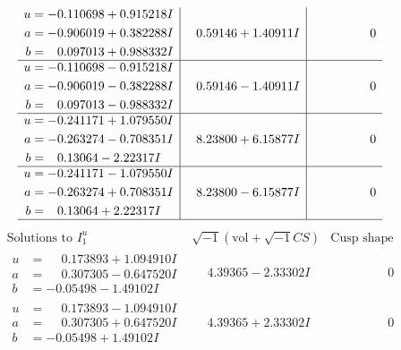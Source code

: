 \documentclass[1p]{elsarticle_modified}
\theoremstyle{definition}
\newcommand{\I}{\sqrt{-1}}
\begin{document}
$$\begin{array}{c|c|c}
\begin{aligned}
u &= -0.110698 + 0.915218 I \\
a &= -0.906019 + 0.382288 I \\
b &= \phantom{-}0.097013 + 0.988332 I\end{aligned}
 & \phantom{-}0.59146 + 1.40911 I & \phantom{-0.000000 } 0 \\ \hline\begin{aligned}
u &= -0.110698 - 0.915218 I \\
a &= -0.906019 - 0.382288 I \\
b &= \phantom{-}0.097013 - 0.988332 I\end{aligned}
 & \phantom{-}0.59146 - 1.40911 I & \phantom{-0.000000 } 0 \\ \hline\begin{aligned}
u &= -0.241171 + 1.079550 I \\
a &= -0.263274 - 0.708351 I \\
b &= \phantom{-}0.13064 - 2.22317 I\end{aligned}
 & \phantom{-}8.23800 + 6.15877 I & \phantom{-0.000000 } 0 \\ \hline\begin{aligned}
u &= -0.241171 - 1.079550 I \\
a &= -0.263274 + 0.708351 I \\
b &= \phantom{-}0.13064 + 2.22317 I\end{aligned}
 & \phantom{-}8.23800 - 6.15877 I & \phantom{-0.000000 } 0\\
 \hline 
 \end{array}$$\newpage$$\begin{array}{c|c|c}  
\text{Solutions to }I^u_{1}& \I (\text{vol} + \sqrt{-1}CS) & \text{Cusp shape}\\
 \hline 
\begin{aligned}
u &= \phantom{-}0.173893 + 1.094910 I \\
a &= \phantom{-}0.307305 - 0.647520 I \\
b &= -0.05498 - 1.49102 I\end{aligned}
 & \phantom{-}4.39365 - 2.33302 I & \phantom{-0.000000 } 0 \\ \hline\begin{aligned}
u &= \phantom{-}0.173893 - 1.094910 I \\
a &= \phantom{-}0.307305 + 0.647520 I \\
b &= -0.05498 + 1.49102 I\end{aligned}
 & \phantom{-}4.39365 + 2.33302 I & \phantom{-0.000000 } 0 \\ \hline\begin{aligned}

\end{aligned}
\end{array}$$
\end{document}
